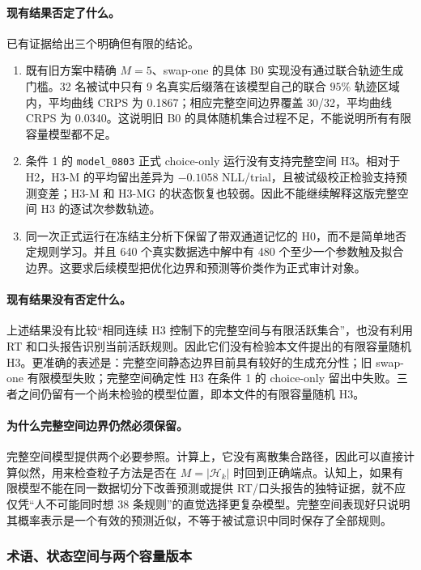 \paragraph{现有结果否定了什么。}
已有证据给出三个明确但有限的结论。
\begin{enumerate}
    \item 既有旧方案中精确 $M=5$、swap-one 的具体 B0 实现没有通过联合轨迹生成门槛。32 名被试中只有 9 名真实后缀落在该模型自己的联合 $95\%$ 轨迹区域内，平均曲线 CRPS 为 0.1867；相应完整空间边界覆盖 30/32，平均曲线 CRPS 为 0.0340。这说明旧 B0 的具体随机集合过程不足，不能说明所有有限容量模型都不足。
    \item 条件 1 的 \texttt{model\_0803} 正式 choice-only 运行没有支持完整空间 H3。相对于 H2，H3-M 的平均留出差异为 $-0.1058$ NLL/trial，且被试级校正检验支持预测变差；H3-M 和 H3-MG 的状态恢复也较弱。因此不能继续解释这版完整空间 H3 的逐试次参数轨迹。
    \item 同一次正式运行在冻结主分析下保留了带双通道记忆的 H0，而不是简单地否定规则学习。并且 640 个真实数据选中解中有 480 个至少一个参数触及拟合边界。这要求后续模型把优化边界和预测等价类作为正式审计对象。
\end{enumerate}

\paragraph{现有结果没有否定什么。}
上述结果没有比较“相同连续 H3 控制下的完整空间与有限活跃集合”，也没有利用 RT 和口头报告识别当前活跃规则。因此它们没有检验本文件提出的有限容量随机 H3。更准确的表述是：完整空间静态边界目前具有较好的生成充分性；旧 swap-one 有限模型失败；完整空间确定性 H3 在条件 1 的 choice-only 留出中失败。三者之间仍留有一个尚未检验的模型位置，即本文件的有限容量随机 H3。

\paragraph{为什么完整空间边界仍然必须保留。}
完整空间模型提供两个必要参照。计算上，它没有离散集合路径，因此可以直接计算似然，用来检查粒子方法是否在 $M=|\mathcal H_k|$ 时回到正确端点。认知上，如果有限模型不能在同一数据切分下改善预测或提供 RT/口头报告的独特证据，就不应仅凭“人不可能同时想 38 条规则”的直觉选择更复杂模型。完整空间表现好只说明其概率表示是一个有效的预测近似，不等于被试意识中同时保存了全部规则。


\subsubsection{术语、状态空间与两个容量版本}

